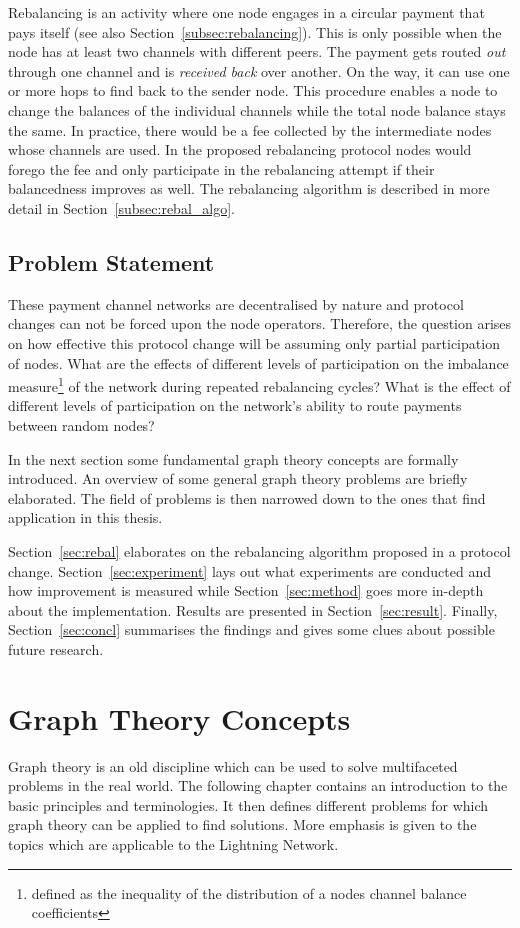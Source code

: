 \documentclass[final]{fhnwreport}       %
\begin{document}
Rebalancing is an activity where one node engages in a circular payment that pays itself (see also Section~\ref{subsec:rebalancing}). This is only possible when the node has at least two channels with different peers. The payment gets routed \emph{out} through one channel and is \emph{received back} over another. On the way, it can use one or more hops to find back to the sender node. This procedure enables a node to change the balances of the individual channels while the total node balance stays the same. In practice, there would be a fee collected by the intermediate nodes whose channels are used. In the proposed rebalancing protocol nodes would forego the fee and only participate in the rebalancing attempt if their balancedness improves as well. The rebalancing algorithm is described in more detail in Section~\ref{subsec:rebal_algo}. 


\subsection{Problem Statement}
These payment channel networks are decentralised by nature and protocol changes can not be forced upon the node operators. Therefore, the question arises on how effective this protocol change will be assuming only partial participation of nodes. What are the effects of different levels of participation on the imbalance measure\footnote{defined as the inequality of the distribution of a nodes channel balance coefficients} of the network during repeated rebalancing cycles? What is the effect of different levels of participation on the network's ability to route payments between random nodes? 

In the next section some fundamental graph theory concepts are formally introduced. An overview of some general graph theory problems are briefly elaborated. The field of problems is then narrowed down to the ones that find application in this thesis.

Section~\ref{sec:rebal} elaborates on the rebalancing algorithm proposed in a protocol change. Section~\ref{sec:experiment} lays out what experiments are conducted and how improvement is measured while Section~\ref{sec:method} goes more in-depth about the implementation. Results are presented in Section~\ref{sec:result}. Finally, Section~\ref{sec:concl} summarises the findings and gives some clues about possible future research.

\newpage
\section{Graph Theory Concepts}\label{sec:graph}
Graph theory is an old discipline which can be used to solve multifaceted problems in the real world. The following chapter contains an introduction to the basic principles and terminologies. It then defines different problems for which graph theory can be applied to find solutions. More emphasis is given to the topics which are applicable to the Lightning Network.
\end{document}
